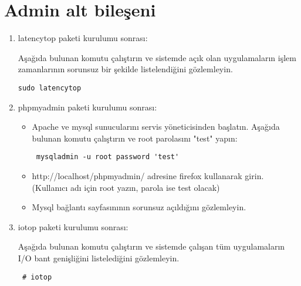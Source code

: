 \documentclass[a4paper,10pt]{article}
\begin{document}
\section{Admin alt bileşeni}
\begin{enumerate}
\item latencytop paketi kurulumu sonrası:

Aşağıda bulunan komutu çalıştırın ve sistemde açık olan uygulamaların işlem zamanlarının sorunsuz bir şekilde listelendiğini gözlemleyin.
\begin{verbatim}
sudo latencytop 
\end{verbatim}

 \item phpmyadmin paketi kurulumu sonrası:
\begin{itemize}
 \item Apache ve mysql sunucularını servis yöneticisinden başlatın. Aşağıda bulunan komutu çalıştırın ve root parolasını "test" yapın:
\begin{verbatim}
 mysqladmin -u root password 'test'
\end{verbatim}

 \item http://localhost/phpmyadmin/ adresine firefox kullanarak girin. (Kullanıcı adı için root yazın, parola ise test olacak)
 \item Mysql bağlantı sayfasınının sorunsuz açıldığını gözlemleyin.
\end{itemize}



 \item iotop paketi kurulumu sonrası:

Aşağıda bulunan komutu çalıştırın ve sistemde çalışan tüm uygulamaların I/O bant genişliğini listelediğini gözlemleyin.
\begin{verbatim}
 # iotop
\end{verbatim}

\end{enumerate}
\end{document}

